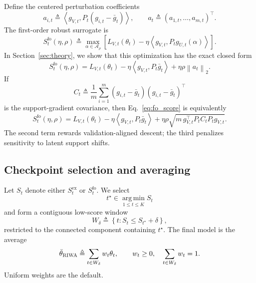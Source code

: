 \documentclass{article}
\newcommand{\argmin}{\operatorname*{arg\,min}}
\newcommand{\riwa}{\textup{\textsc{RIWA}}}
\newcommand{\norm}[1]{\left\lVert #1 \right\rVert}
\newcommand{\inner}[2]{\left\langle #1, #2 \right\rangle}
\begin{document}
Define the centered perturbation coefficients
\begin{equation}
    a_{i,t} \triangleq \inner{g_{V,t}}{P_t(g_{i,t}-\bar g_t)},
    \qquad
    a_t \triangleq (a_{1,t},\dots,a_{m,t})^\top.
\end{equation}
The first-order robust surrogate is
\begin{equation}
    S_t^{\mathrm{fo}}(\eta,\rho)
    \triangleq
    \max_{\alpha \in \mathcal{A}_{\rho}}
    \left[
    L_{V,t}(\theta_t) - \eta \inner{g_{V,t}}{P_t g_{U,t}(\alpha)}
    \right].
\end{equation}
In Section~\ref{sec:theory}, we show that this optimization has the exact closed form
\begin{equation}
    S_t^{\mathrm{fo}}(\eta,\rho)
    =
    L_{V,t}(\theta_t)
    -
    \eta \inner{g_{V,t}}{P_t \bar g_t}
    +
    \eta \rho \norm{a_t}_2.
    \label{eq:fo_score}
\end{equation}
If
\begin{equation}
    C_t
    \triangleq
    \frac{1}{m}\sum_{i=1}^{m}(g_{i,t}-\bar g_t)(g_{i,t}-\bar g_t)^\top
\end{equation}
is the support-gradient covariance, then Eq.~\eqref{eq:fo_score} is equivalently
\begin{equation}
    S_t^{\mathrm{fo}}(\eta,\rho)
    =
    L_{V,t}(\theta_t)
    -
    \eta \inner{g_{V,t}}{P_t \bar g_t}
    +
    \eta \rho \sqrt{m\, g_{V,t}^\top P_t C_t P_t g_{V,t}}.
    \label{eq:fo_covariance}
\end{equation}
The second term rewards validation-aligned descent; the third penalizes sensitivity to latent support shifts.

\subsection{Checkpoint selection and averaging}

Let $S_t$ denote either $S_t^{\mathrm{ex}}$ or $S_t^{\mathrm{fo}}$. We select
\begin{equation}
    t^\star \in \argmin_{1 \le t \le K} S_t
\end{equation}
and form a contiguous low-score window
\begin{equation}
    W_{\delta}
    \triangleq
    \left\{
    t : S_t \le S_{t^\star} + \delta
    \right\},
\end{equation}
restricted to the connected component containing $t^\star$. The final model is the average
\begin{equation}
    \bar \theta_{\riwa}
    \triangleq
    \sum_{t \in W_{\delta}} w_t \theta_t,
    \qquad
    w_t \ge 0,\quad \sum_{t \in W_{\delta}} w_t = 1.
\end{equation}
Uniform weights are the default.
\end{document}
